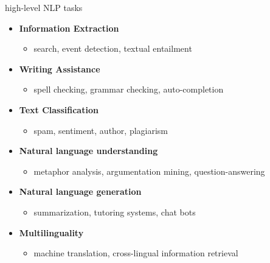 \begin{frame}{high-level NLP tasks}

\vfill

\begin{itemize}
	\item \textbf{Information Extraction}
	\begin{itemize}
		\item search, event detection, textual entailment
	\end{itemize}
	\item \textbf{Writing Assistance} 
	\begin{itemize}
		\item spell checking, grammar checking, auto-completion
	\end{itemize}
	\item \textbf{Text Classification}
	\begin{itemize}
		\item spam, sentiment, author, plagiarism
	\end{itemize}
	\item \textbf{Natural language understanding} 
	\begin{itemize}
		\item metaphor analysis, argumentation mining, question-answering
	\end{itemize}
	\item \textbf{Natural language generation}
	\begin{itemize}
		\item summarization, tutoring systems, chat bots
	\end{itemize}
	\item \textbf{Multilinguality}
	\begin{itemize}
		\item machine translation, cross-lingual information retrieval
	\end{itemize}
\end{itemize}

\vfill

\end{frame}


